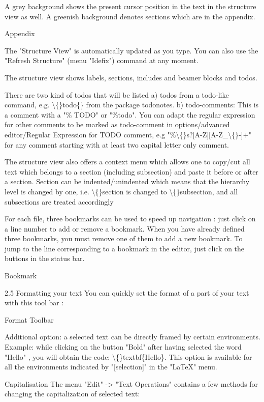 \documentclass{article}
\begin{document}
	A grey background shows the present cursor position in the text in the structure view as well. A greenish background denotes sections which are in the appendix.
	
	Appendix
	
	The "Structure View" is automatically updated as you type. You can also use the "Refresh Structure" (menu "Idefix") command at any moment.
	
	The structure view shows labels, sections, includes and beamer blocks and todos.
	
	There are two kind of todos that will be listed a) todos from a todo-like command, e.g. \textbackslash\{\}todo\{\} from the package todonotes. b) todo-comments: This is a comment with a "\% TODO" or "\%todo". You can adapt the regular expression for other comments to be marked as todo-comment in options/advanced editor/Regular Expression for TODO comment, e.g "\%\textbackslash\{\}s?[A-Z][A-Z\_\textbackslash\{\}-]+" for any comment starting with at least two capital letter only comment.
	
	The structure view also offers a context menu which allows one to copy/cut all text which belongs to a section (including subsection) and paste it before or after a section. Section can be indented/unindented which means that the hierarchy level is changed by one, i.e. \textbackslash\{\}section is changed to \textbackslash\{\}subsection, and all subsections are treated accordingly
	
	For each file, three bookmarks can be used to speed up navigation : just click on a line number to add or remove a bookmark. When you have already defined three bookmarks, you must remove one of them to add a new bookmark. To jump to the line corresponding to a bookmark in the editor, just click on the buttons in the status bar.
	
	Bookmark
	
	2.5 Formatting your text
	You can quickly set the format of a part of your text with this tool bar :
	
	Format Toolbar
	
	Additional option: a selected text can be directly framed by certain environments. Example: while clicking on the button "Bold" after having selected the word "Hello" , you will obtain the code: \textbackslash\{\}textbf\{Hello\}.
	This option is available for all the environments indicated by "[selection]" in the "LaTeX" menu.
	
	Capitalisation
	The menu "Edit" -> "Text Operations" contains a few methods for changing the capitalization of selected text:
	
\end{document}
